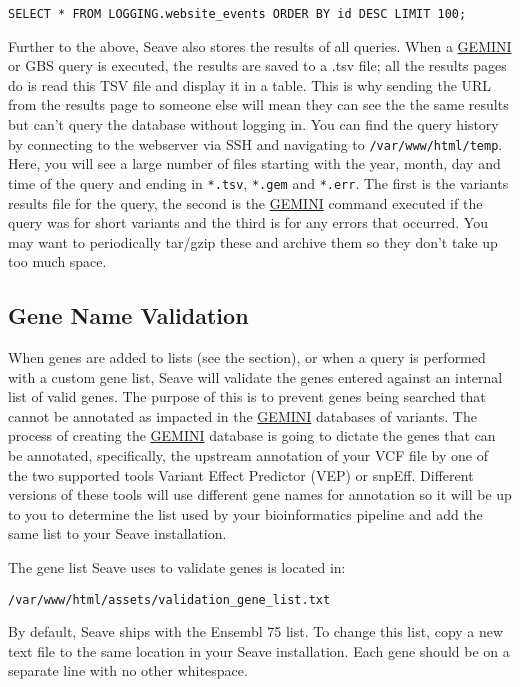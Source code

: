 \documentclass[11pt, a4paper]{article}
\newcommand{\GEMINI}{\href{https://gemini.readthedocs.io}{GEMINI} } %
\begin{document}
\begin{lstlisting}
SELECT * FROM LOGGING.website_events ORDER BY id DESC LIMIT 100;
\end{lstlisting}

Further to the above, Seave also stores the results of all queries. When a \GEMINI or GBS query is executed, the results are saved to a .tsv file; all the results pages do is read this TSV file and display it in a table. This is why sending the URL from the results page to someone else will mean they can see the the same results but can't query the database without logging in. You can find the query history by connecting to the webserver via SSH and navigating to \texttt{/var/www/html/temp}. Here, you will see a large number of files starting with the year, month, day and time of the query and ending in \texttt{*.tsv}, \texttt{*.gem} and \texttt{*.err}. The first is the variants results file for the query, the second is the \GEMINI command executed if the query was for short variants and the third is for any errors that occurred. You may want to periodically tar/gzip these and archive them so they don't take up too much space.


\subsection{Gene Name Validation}\label{geneNameValidation}

When genes are added to lists (see the  section), or when a query is performed with a custom gene list, Seave will validate the genes entered against an internal list of valid genes. The purpose of this is to prevent genes being searched that cannot be annotated as impacted in the \GEMINI databases of variants. The process of creating the \GEMINI database is going to dictate the genes that can be annotated, specifically, the upstream annotation of your VCF file by one of the two supported tools Variant Effect Predictor (VEP) or snpEff. Different versions of these tools will use different gene names for annotation so it will be up to you to determine the list used by your bioinformatics pipeline and add the same list to your Seave installation.

The gene list Seave uses to validate genes is located in:

\texttt{/var/www/html/assets/validation\_gene\_list.txt}

By default, Seave ships with the Ensembl 75 list. To change this list, copy a new text file to the same location in your Seave installation. Each gene should be on a separate line with no other whitespace.

\end{document}
